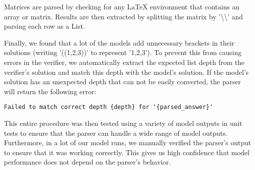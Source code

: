 Matrices are parsed by checking for any \LaTeX{}  environment that contains an array or matrix. Results are then extracted by splitting the matrix by '\textbackslash\textbackslash' and parsing each row as a List.

Finally, we found that a lot of the models add unnecessary brackets in their solutions (\eg writing '((1,2,3))' to represent '1,2,3'). To prevent this from causing errors in the verifier, we automatically extract the expected list depth from the verifier's solution and match this depth with the model's solution. If the model's solution has an unexpected depth that can not be easily converted, the parser will return the following error:
\begin{verbatim}
Failed to match correct depth {depth} for '{parsed_answer}'
\end{verbatim}
This entire procedure was then tested using a variety of model outputs in unit tests to ensure that the parser can handle a wide range of model outputs. Furthermore, in a lot of our model runs, we manually verified the parser's output to ensure that it was working correctly. This gives us high confidence that model performance does not depend on the parser's behavior.
